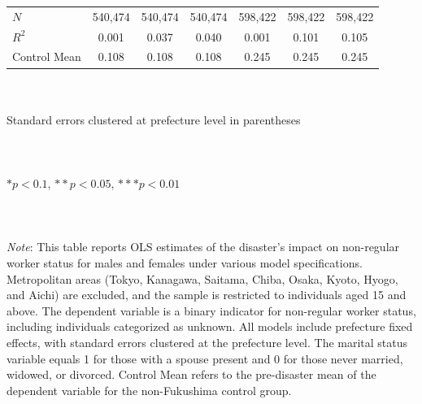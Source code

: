 \documentclass[serif, aspectratio=169]{beamer}
\begin{document}
\begin{frame}
\begin{table}[htbp]
\begin{tabular}{@{}l*{6}{c}@{}}
$\textit{N}$&  540,474         &  540,474         &  540,474         &  598,422         &  598,422         &  598,422         \\
$\textit{R}^2$&    0.001         &    0.037         &    0.040         &    0.001         &    0.101         &    0.105         \\
Control Mean&    0.108         &    0.108         &    0.108         &    0.245         &    0.245         &    0.245         \\
\bottomrule
\end{tabular}
\\\\{\linewidth}{\tiny Standard errors clustered at prefecture level in parentheses}\\\\
\\\\{\linewidth}{\tiny $*p<0.1$, $**p<0.05$, $***p<0.01$}\\\\
\\\\{\linewidth}{\tiny \textit{Note}: This table reports OLS estimates of the disaster's impact on non-regular worker status for males and females under various model specifications. Metropolitan areas (Tokyo, Kanagawa, Saitama, Chiba, Osaka, Kyoto, Hyogo, and Aichi) are excluded, and the sample is restricted to individuals aged 15 and above. The dependent variable is a binary indicator for non-regular worker status, including individuals categorized as unknown. All models include prefecture fixed effects, with standard errors clustered at the prefecture level. The marital status variable equals 1 for those with a spouse present and 0 for those never married, widowed, or divorced. Control Mean refers to the pre-disaster mean of the dependent variable for the non-Fukushima control group.}
\end{table}

\end{frame}

\end{document}
